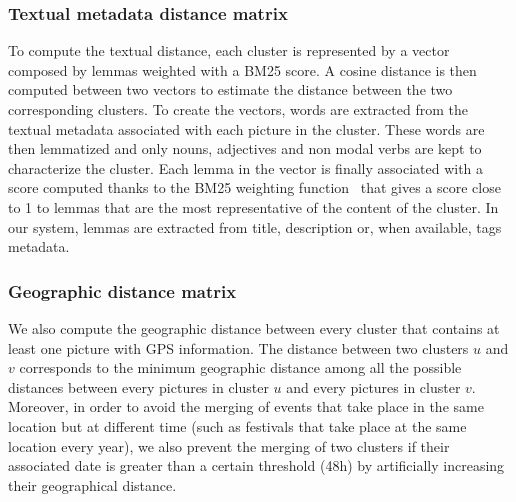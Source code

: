 \documentclass{acm_proc_article-me11_tweaked}
\begin{document}
\subsubsection{Textual metadata distance matrix}\label{text}
To compute the textual distance, each cluster is represented by a vector composed by lemmas weighted with a BM25 score. A cosine distance is then computed between two vectors to estimate the distance between the two corresponding clusters.
To create the vectors, words are extracted from the textual metadata associated with each picture in the cluster. These words are then lemmatized and only nouns, adjectives and non modal verbs are kept to characterize the cluster. Each lemma in the vector is finally associated with a score computed thanks to the BM25 weighting function~\cite{robertson1995okapi} that gives a score close to 1 to lemmas that are the most representative of the content of the cluster.
In our system, lemmas are extracted from title, description or, when available, tags metadata.%

\subsubsection{Geographic distance matrix}\label{geo}
We also compute the geographic distance between every cluster that contains at least one picture with GPS information. The distance between two clusters $u$ and $v$ corresponds to the minimum geographic distance among all the possible distances between every pictures in cluster $u$ and every pictures in cluster $v$. Moreover, in order to avoid the merging of events that take place in the same location but at different time (such as festivals that take place at the same location every year), we also prevent the merging of two clusters if their associated date is greater than a certain threshold (48h) by artificially increasing their geographical distance.
\end{document}
